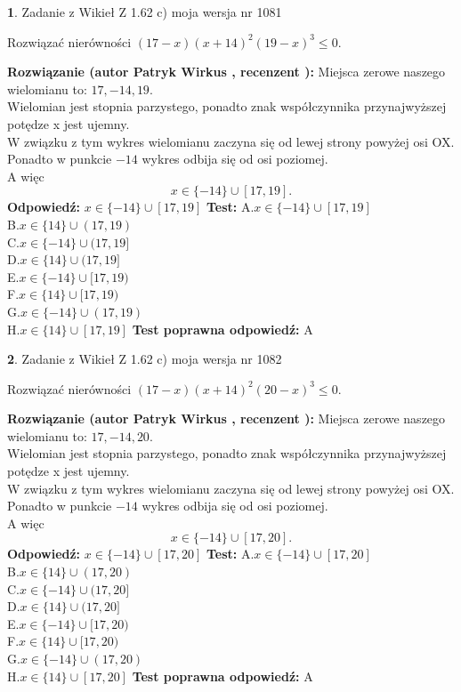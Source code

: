 \documentclass[12pt, a4paper]{article}
\theoremstyle{definition} %
\newtheorem{zad}{}
\newcommand{\zadStart}[1]{\begin{zad}#1\newline}
\newcommand{\zadStop}{\end{zad}}
\newcommand{\rozwStart}[2]{\noindent \textbf{Rozwiązanie (autor #1 , recenzent #2): }\newline}
\newcommand{\rozwStop}{\newline}
\newcommand{\odpStart}{\noindent \textbf{Odpowiedź:}\newline}
\newcommand{\odpStop}{\newline}
\newcommand{\testStart}{\noindent \textbf{Test:}\newline}
\newcommand{\testStop}{\newline}
\newcommand{\kluczStart}{\noindent \textbf{Test poprawna odpowiedź:}\newline}
\newcommand{\kluczStop}{\newline}
\begin{document}
\zadStart{Zadanie z Wikieł Z 1.62 c) moja wersja nr 1081}

Rozwiązać nierówności $(17-x)(x+14)^{2}(19-x)^{3}\le0$.
\zadStop
\rozwStart{Patryk Wirkus}{}
Miejsca zerowe naszego wielomianu to: $17, -14, 19$.\\
Wielomian jest stopnia parzystego, ponadto znak współczynnika przy\linebreak najwyższej potędze x jest ujemny.\\ W związku z tym wykres wielomianu zaczyna się od lewej strony powyżej osi OX.\\
Ponadto w punkcie $-14$ wykres odbija się od osi poziomej.\\
A więc $$x \in \{-14\} \cup [17,19].$$
\rozwStop
\odpStart
$x \in \{-14\} \cup [17,19]$
\odpStop
\testStart
A.$x \in \{-14\} \cup [17,19]$\\
B.$x \in \{14\} \cup (17,19)$\\
C.$x \in \{-14\} \cup (17,19]$\\
D.$x \in \{14\} \cup (17,19]$\\
E.$x \in \{-14\} \cup [17,19)$\\
F.$x \in \{14\} \cup [17,19)$\\
G.$x \in \{-14\} \cup (17,19)$\\
H.$x \in \{14\} \cup [17,19]$
\testStop
\kluczStart
A
\kluczStop



\zadStart{Zadanie z Wikieł Z 1.62 c) moja wersja nr 1082}

Rozwiązać nierówności $(17-x)(x+14)^{2}(20-x)^{3}\le0$.
\zadStop
\rozwStart{Patryk Wirkus}{}
Miejsca zerowe naszego wielomianu to: $17, -14, 20$.\\
Wielomian jest stopnia parzystego, ponadto znak współczynnika przy\linebreak najwyższej potędze x jest ujemny.\\ W związku z tym wykres wielomianu zaczyna się od lewej strony powyżej osi OX.\\
Ponadto w punkcie $-14$ wykres odbija się od osi poziomej.\\
A więc $$x \in \{-14\} \cup [17,20].$$
\rozwStop
\odpStart
$x \in \{-14\} \cup [17,20]$
\odpStop
\testStart
A.$x \in \{-14\} \cup [17,20]$\\
B.$x \in \{14\} \cup (17,20)$\\
C.$x \in \{-14\} \cup (17,20]$\\
D.$x \in \{14\} \cup (17,20]$\\
E.$x \in \{-14\} \cup [17,20)$\\
F.$x \in \{14\} \cup [17,20)$\\
G.$x \in \{-14\} \cup (17,20)$\\
H.$x \in \{14\} \cup [17,20]$
\testStop
\kluczStart
A
\kluczStop
\end{document}
